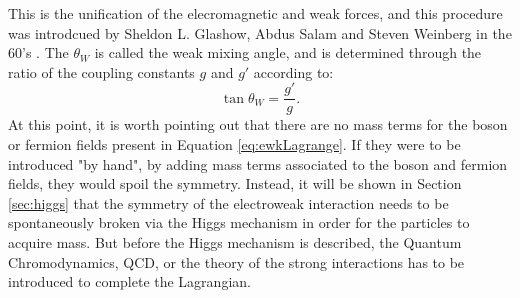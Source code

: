This is the unification of the elecromagnetic and weak forces, and this procedure was introdcued by Sheldon L. Glashow, Abdus Salam and Steven Weinberg in the 60's \cite{Glashow:1961tr,Salam:1968rm,Weinberg:1967tq}. 
The $\theta_{W}$ is called the weak mixing angle, and is determined through the ratio of the coupling constants $g$ and $g'$ according to:
\begin{equation}
\tan\theta_{W}=\frac{g'}{g}.
\end{equation}
At this point, it is worth pointing out that there are no mass terms for the boson or fermion fields present in Equation \ref{eq:ewkLagrange}. 
If they were to be introduced "by hand", by adding mass terms associated to the boson and fermion fields, they would spoil the symmetry. 
Instead, it will be shown in Section \ref{sec:higgs} that the symmetry of the electroweak interaction needs to be spontaneously broken via the Higgs mechanism in order for the particles to acquire mass.
But before the Higgs mechanism is described, the Quantum Chromodynamics, QCD, or the theory of the strong interactions has to be introduced to complete the Lagrangian.  
